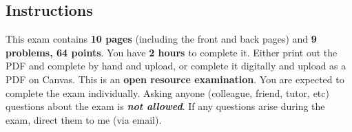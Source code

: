 \documentclass[12pt,twoside]{article}
\newcommand{\?}{\stackrel{?}{=}}
\newcommand{\rd}{\color{red}}
\newcommand{\class}{CEE 260/MIE 273: Probability \& Statistics in Civil Engineering}
\newcommand{\examnum}{Midterm Exam}
\begin{document}
\title{\vspace{-5ex}{\sc \examnum}}
\author{\bf \class}
\date{October 14, 2025\\[4mm]
   {\sc time limit:} {\bf \sc Two Hours}
}
%
\clearpage
\maketitle



\subsection*{Instructions}
This exam contains\textbf{ 10 pages} (including the front and back pages) and \textbf{9 problems, 64 points}. 
You have {\bf 2 hours} to complete it.  Either print out the PDF and complete by hand and upload, or complete it digitally 
and upload as a PDF on Canvas.
\noindent This is an \textbf{open resource examination}. You are expected to complete the exam individually. Asking
anyone (colleague, friend, tutor, etc) questions about the exam is \textit{\rd \bf not allowed}. If any questions arise during the exam, direct them to me (via email).
\\
 
\end{document}
